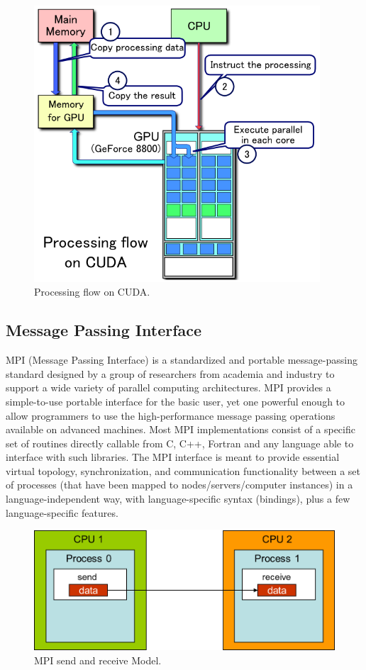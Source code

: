 \begin{figure}[htbp]
	\centering
	\includegraphics[width=4.2in]{fig/CUDA.png}
	\caption{Processing flow on CUDA.}
	\label{cuda_flow}
\end{figure}

\subsection{Message Passing Interface}

MPI (Message Passing Interface) \cite{gropp1999using} is a standardized and portable message-passing standard designed by a group of researchers from academia and industry to support a wide variety of parallel computing architectures. MPI provides a simple-to-use portable interface for the basic user, yet one powerful enough to allow programmers to use the high-performance message passing operations available on advanced machines. Most MPI implementations consist of a specific set of routines directly callable from C, C++, Fortran and any language able to interface with such libraries. The MPI interface is meant to provide essential virtual topology, synchronization, and communication functionality between a set of processes (that have been mapped to nodes/servers/computer instances) in a language-independent way, with language-specific syntax (bindings), plus a few language-specific features. 

\begin{figure}[htbp]
	\centering
	\includegraphics[width=5.4in]{fig/mpi_send_recv.jpg}
	\caption{MPI send and receive Model.}
	\label{mpi_model}
\end{figure}

